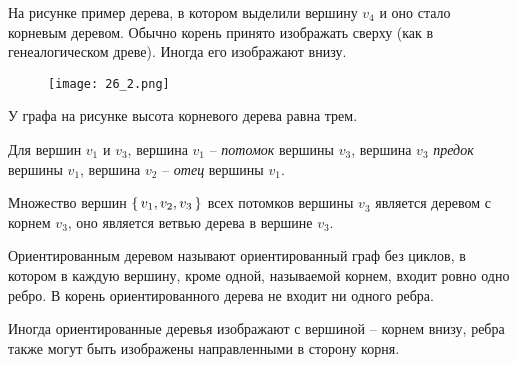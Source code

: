 На рисунке пример дерева, в котором выделили вершину $v_4$ и оно стало
корневым деревом. Обычно корень принято изображать сверху (как в
генеалогическом древе). Иногда его изображают внизу.

\begin{figure}[h]
    \centering
    \texttt{[image: 26\_2.png]}
\end{figure}

У графа на рисунке высота корневого дерева равна трем.

Для вершин $v_1$ и $v_3$, вершина $v_1$ -- \textit{потомок} вершины $v_3$, вершина $v_3$ \textit{предок}
вершины $v_1$, вершина $v_2$ -- \textit{отец} вершины $v_1$.

Множество вершин $\set{v_1, v_2, v_3}$ всех потомков вершины $v_3$ является деревом с
корнем $v_3$, оно является ветвью дерева в вершине $v_3$.

\begin{definition}
    Ориентированным деревом называют ориентированный граф
    без циклов, в котором в каждую вершину, кроме одной, называемой корнем,
    входит ровно одно ребро. В корень ориентированного дерева не входит ни
    одного ребра.
\end{definition}

Иногда ориентированные деревья изображают с вершиной -- корнем
внизу, ребра также могут быть изображены направленными в сторону корня.